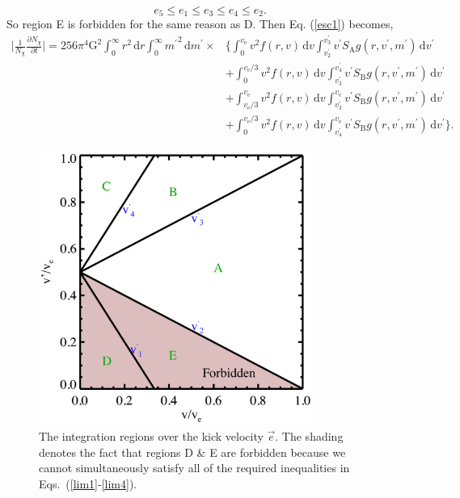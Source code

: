 \documentclass[aps,floatfix,prd,showpacs]{revtex4}
\newcommand{\diff}{\mathrm{d}}
\newcommand{\vesc}{v_{\text{e}}}
\newcommand{\vp}{v^\prime}
\newcommand{\mpr}{m^\prime}
\newcommand{\SA}{S_{\text{A}}}
\newcommand{\SB}{S_{\text{B}}}
\newcommand{\G}{\text{G}}
\newcommand{\Nx}{N_\chi}
\begin{document}
%
\begin{equation}
e_5 \le e_1 \le e_3 \le e_4 \le e_2.
\end{equation}
%
%
So region E is forbidden for the same reason as D.  Then Eq. (\ref{esc1}) becomes,
%
\begin{equation}
\label{esc2}
\begin{split}
\bigg|\frac{1}{\Nx}\frac{\partial \Nx}{\partial t}\bigg| = 256\pi^4\G^2\int^\infty_0{r^2}\,\diff r\int^\infty_0{\mpr}^2\,\diff \mpr \times&\Bigg\{\int^{\vesc}_0{v^2f(r,v)}\,\diff v\int^{\vp_3}_{\vp_2}{\vp \SA g(r,\vp,\mpr)}\,\diff \vp \\
 &+ \int^{\vesc/3}_0{v^2f(r,v)}\,\diff v\int^{\vp_4}_{\vp_3}{\vp \SB g(r,\vp,\mpr)}\,\diff \vp \\ &+ \int^{\vesc}_{\vesc/3}{v^2f(r,v)}\,\diff v\int^{\vesc}_{\vp_3}{\vp \SB g(r,\vp,\mpr)}\,\diff \vp \\
&+\int^{\vesc/3}_0{v^2f(r,v)}\,\diff v\int^{\vesc}_{\vp_4}{\vp \SB g(r,\vp,\mpr)}\,\diff \vp\Bigg\}.
\end{split}
\end{equation}
%
\begin{figure}[htp]
\centering
\includegraphics[width=9cm, height=9cm]{regions}
\caption{The integration regions over the kick velocity $\vec{e}$.  The shading denotes the fact that regions D \& E are forbidden because we cannot simultaneously satisfy all of the required inequalities in Eqs.~(\ref{lim1}-\ref{lim4}).}
\label{regions}
\end{figure}
%
%
\end{document}
